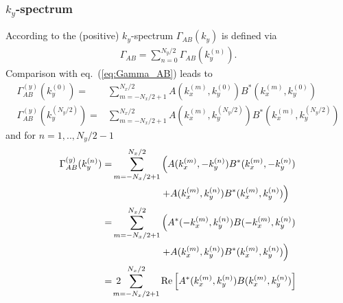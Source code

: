\documentclass[12pt, a4paper, fleqn]{article}
\begin{document}
\subsubsection{$k_y$-spectrum}
According to \cite{Jenko99} the (positive) $k_y$-spectrum $\Gamma_{AB}(k_y)$ is defined via
\begin{align}
\Gamma_{AB} = \sum_{n=0}^{N_y/2} \Gamma_{AB}(k^{(n)}_y). \nonumber
\end{align}
Comparison with eq.~(\ref{eq:Gamma_AB}) leads to 
\begin{align}
\Gamma^{(y)}_{AB}(k^{(0)}_y)= & \sum_{m=-N_x/2+1}^{N_x/2} A(k^{(m)}_x, k^{(0)}_y) B^*(k^{(m)}_{x}, k^{(0)}_{y})
\\
\Gamma^{(y)}_{AB}(k^{(N_y/2)}_y) = & \sum_{m=-N_x/2+1}^{N_x/2} A(k^{(m)}_x, k^{(N_y/2)}_y) B^*(k^{(m)}_{x}, k^{(N_y/2)}_{y})
\end{align}
and for $n=1,..,N_y/2-1$
\begin{align}
\Gamma^{(y)}_{AB}(k^{(n)}_y) = & \sum_{m = -N_x/2+1}^{N_x/2}\left(A(k_x^{(m)},-k_y^{(n)}) B^*(k_x^{(m)}, -k_y^{(n)})\right. \nonumber \\ 
& \left. \hspace{5em} + A(k_x^{(m)},k_y^{(n)}) B^*(k_x^{(m)},k_y^{(n)})\right) \nonumber \\
= & \sum_{m = -N_x/2+1}^{N_x/2}\left(A^*(-k_x^{(m)},k_y^{(n)}) B(-k_x^{(m)}, k_y^{(n)}) \right. \nonumber \\
& \left. \hspace{5em} + A(k_x^{(m)},k_y^{(n)}) B^*(k_x^{(m)},k_y^{(n)})\right) \nonumber \\
= & \hspace{1ex} 2 \hspace{-1em} \sum_{m = -N_x/2+1}^{N_x/2}{\rm Re}\left[A^*(k^{(m)}_x, k^{(n)}_y) B(k^{(m)}_x, k^{(n)}_y)\right] \nonumber \\
\end{align}
\end{document}
